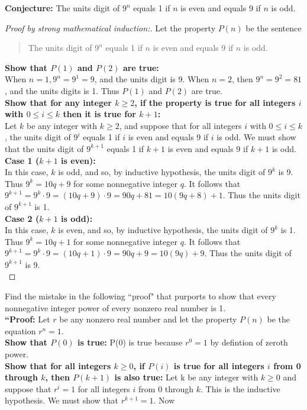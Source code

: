 \documentclass[12pt,letterpaper, onecolumn]{exam}
\begin{document}
\begin{questions}
\begin{solution}
		\textbf{Conjecture: }The units digit of $9^n$ equals 1 if $n$ is even and equals 9 if $n$ is odd.
		\begin{proof}[Proof by strong mathematical induction:]
		 Let the property $P(n)$ be the sentence
		\begin{quote}
			The units digit of $9^n$ equals 1 if $n$ is even and equals 9 if $n$ is odd.
		\end{quote}
		\textbf{Show that $P(1)$ and $P(2)$ are true:}\\
		When $n=1, 9^n=9^1=9$, and the units digit is 9. When $n=2$, then $9^n=9^2=81$, and the units digits is 1. Thus $P(1)$ and $P(2)$ are true.\\
		\textbf{Show that for any integer $k\geq2$, if the property is true for all integers $i$ with $0\leq i \leq k$ then it is true for $k+1$:}\\
		Let $k$ be any integer with $k\geq2$, and suppose that for all integers $i$ with $0\leq i \leq k$, the units digit of $9^i$ equals 1 if $i$ is even and equals 9 if $i$ is odd. We must show that the units digit of $9^{k+1}$ equals 1 if $k+1$ is even and equals 9 if $k+1$ is odd.\\
		\textbf{Case 1 ($k+1$ is even):}\\
		In this case, $k$ is odd, and so, by inductive hypothesis, the units digit of $9^k$ is 9. Thus $9^k=10q+9$ for some nonnegative integer $q$. It follows that $9^{k+1}=9^k\cdot 9=(10q+9)\cdot 9=90q+81=10(9q+8)+1$. Thus the units digit of $9^{k+1}$ is 1.\\
		\textbf{Case 2 ($k+1$ is odd):}\\
		In this case, $k$ is even, and so, by inductive hypothesis, the units digit of $9^k$ is 1. Thus $9^k=10q+1$ for some nonnegative integer $q$. It follows that $9^{k+1}=9^k\cdot 9=(10q+1)\cdot 9=90q+9=10(9q)+9$. Thus the units digit of $9^{k+1}$ is 9.\\
		\end{proof}
		\end{solution}
		\question Find the mistake in the following ``proof" that purports to show that every nonnegative integer power of every nonzero real number is 1.\\
		\textbf{``Proof:} Let $r$ be any nonzero real number and let the property $P(n)$ be the equation $r^n=1.$\\
		\textbf{Show that $P(0)$ is true:} P(0) is true because $r^0=1$ by defintion of zeroth power.\\
		\textbf{Show that for all integers $k\geq0$, if $P(i)$ is true for all integers $i$ from 0 through $k$, then $P(k+1)$ is also true:} Let k be any integer with $k\geq0$ and suppose that $r^i=1$ for all integers $i$ from 0 through $k$. This is the inductive hypothesis. We must show that $r^{k+1}=1.$ Now\\

\end{questions}
\end{document}
